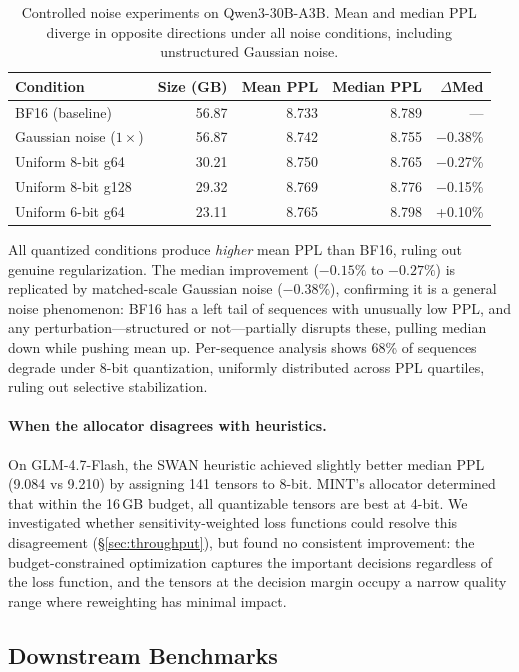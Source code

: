 \documentclass{article}
\begin{document}
\begin{table}[h]
\centering
\caption{Controlled noise experiments on Qwen3-30B-A3B. Mean and median PPL diverge in opposite directions under all noise conditions, including unstructured Gaussian noise.}
\label{tab:noise_experiment}
\begin{tabular}{lrrrr}
\toprule
Condition & Size (GB) & Mean PPL & Median PPL & $\Delta$Med \\
\midrule
BF16 (baseline) & 56.87 & 8.733 & 8.789 & --- \\
Gaussian noise ($1\times$) & 56.87 & 8.742 & 8.755 & $-$0.38\% \\
Uniform 8-bit g64 & 30.21 & 8.750 & 8.765 & $-$0.27\% \\
Uniform 8-bit g128 & 29.32 & 8.769 & 8.776 & $-$0.15\% \\
Uniform 6-bit g64 & 23.11 & 8.765 & 8.798 & +0.10\% \\
\bottomrule
\end{tabular}
\end{table}

All quantized conditions produce \emph{higher} mean PPL than BF16, ruling out genuine regularization. The median improvement ($-0.15\%$ to $-0.27\%$) is replicated by matched-scale Gaussian noise ($-0.38\%$), confirming it is a general noise phenomenon: BF16 has a left tail of sequences with unusually low PPL, and any perturbation---structured or not---partially disrupts these, pulling median down while pushing mean up. Per-sequence analysis shows 68\% of sequences degrade under 8-bit quantization, uniformly distributed across PPL quartiles, ruling out selective stabilization.

\paragraph{When the allocator disagrees with heuristics.}
On GLM-4.7-Flash, the SWAN heuristic achieved slightly better median PPL (9.084 vs 9.210) by assigning 141 tensors to 8-bit. MINT's allocator determined that within the 16\,GB budget, all quantizable tensors are best at 4-bit. We investigated whether sensitivity-weighted loss functions could resolve this disagreement (\S\ref{sec:throughput}), but found no consistent improvement: the budget-constrained optimization captures the important decisions regardless of the loss function, and the tensors at the decision margin occupy a narrow quality range where reweighting has minimal impact.

\subsection{Downstream Benchmarks}
\label{sec:downstream_benchmarks}
\end{document}
